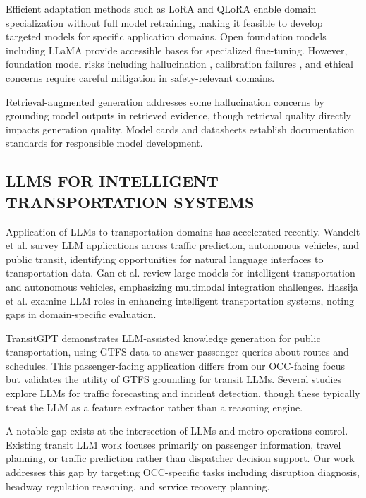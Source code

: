 \documentclass{IEEEoj}
\begin{document}
Efficient adaptation methods such as LoRA \cite{hu2022lora} and QLoRA \cite{dettmers2023qlora} enable domain specialization without full model retraining, making it feasible to develop targeted models for specific application domains. Open foundation models including LLaMA \cite{touvron2023llama, touvron2023llama2} provide accessible bases for specialized fine-tuning. However, foundation model risks including hallucination \cite{ji2023survey}, calibration failures \cite{guo2017calibration}, and ethical concerns \cite{bender2021dangers, weidinger2022ethical} require careful mitigation in safety-relevant domains.

Retrieval-augmented generation \cite{lewis2020retrieval} addresses some hallucination concerns by grounding model outputs in retrieved evidence, though retrieval quality directly impacts generation quality. Model cards \cite{mitchell2019model} and datasheets \cite{gebru2021datasheets} establish documentation standards for responsible model development.

\subsection{LLMS FOR INTELLIGENT TRANSPORTATION SYSTEMS}

Application of LLMs to transportation domains has accelerated recently. Wandelt et al. \cite{wandelt2024large} survey LLM applications across traffic prediction, autonomous vehicles, and public transit, identifying opportunities for natural language interfaces to transportation data. Gan et al. \cite{gan2024large} review large models for intelligent transportation and autonomous vehicles, emphasizing multimodal integration challenges. Hassija et al. \cite{hassija2025role} examine LLM roles in enhancing intelligent transportation systems, noting gaps in domain-specific evaluation.

TransitGPT \cite{devunuri2025transitgpt} demonstrates LLM-assisted knowledge generation for public transportation, using GTFS data to answer passenger queries about routes and schedules. This passenger-facing application differs from our OCC-facing focus but validates the utility of GTFS grounding for transit LLMs. Several studies explore LLMs for traffic forecasting and incident detection, though these typically treat the LLM as a feature extractor rather than a reasoning engine.

A notable gap exists at the intersection of LLMs and metro operations control. Existing transit LLM work focuses primarily on passenger information, travel planning, or traffic prediction rather than dispatcher decision support. Our work addresses this gap by targeting OCC-specific tasks including disruption diagnosis, headway regulation reasoning, and service recovery planning.
\end{document}
